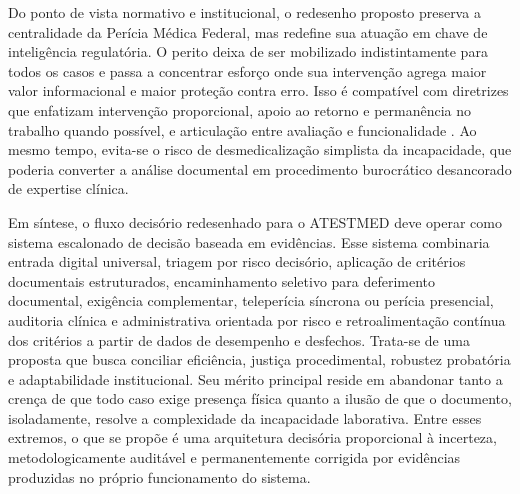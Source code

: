 \documentclass[12pt,a4paper]{article}
\begin{document}
Do ponto de vista normativo e institucional, o redesenho proposto preserva a centralidade da Perícia Médica Federal, mas redefine sua atuação em chave de inteligência regulatória. O perito deixa de ser mobilizado indistintamente para todos os casos e passa a concentrar esforço onde sua intervenção agrega maior valor informacional e maior proteção contra erro. Isso é compatível com diretrizes que enfatizam intervenção proporcional, apoio ao retorno e permanência no trabalho quando possível, e articulação entre avaliação e funcionalidade \parencite{gabbay2011niceguidanceonlongtermsicknessandincapacity}. Ao mesmo tempo, evita-se o risco de desmedicalização simplista da incapacidade, que poderia converter a análise documental em procedimento burocrático desancorado de expertise clínica.

Em síntese, o fluxo decisório redesenhado para o ATESTMED deve operar como sistema escalonado de decisão baseada em evidências. Esse sistema combinaria entrada digital universal, triagem por risco decisório, aplicação de critérios documentais estruturados, encaminhamento seletivo para deferimento documental, exigência complementar, teleperícia síncrona ou perícia presencial, auditoria clínica e administrativa orientada por risco e retroalimentação contínua dos critérios a partir de dados de desempenho e desfechos. Trata-se de uma proposta que busca conciliar eficiência, justiça procedimental, robustez probatória e adaptabilidade institucional. Seu mérito principal reside em abandonar tanto a crença de que todo caso exige presença física quanto a ilusão de que o documento, isoladamente, resolve a complexidade da incapacidade laborativa. Entre esses extremos, o que se propõe é uma arquitetura decisória proporcional à incerteza, metodologicamente auditável e permanentemente corrigida por evidências produzidas no próprio funcionamento do sistema.
\end{document}

